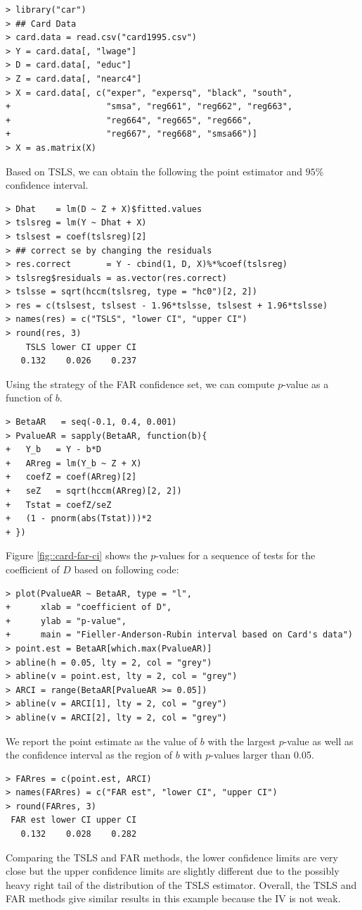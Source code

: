 \begin{lstlisting}
> library("car")
> ## Card Data
> card.data = read.csv("card1995.csv")
> Y = card.data[, "lwage"]
> D = card.data[, "educ"]
> Z = card.data[, "nearc4"]
> X = card.data[, c("exper", "expersq", "black", "south", 
+                   "smsa", "reg661", "reg662", "reg663", 
+                   "reg664", "reg665", "reg666", 
+                   "reg667", "reg668", "smsa66")]
> X = as.matrix(X)
\end{lstlisting}


Based on TSLS, we can obtain the following the point estimator and $95\%$ confidence interval. 
\begin{lstlisting}
> Dhat    = lm(D ~ Z + X)$fitted.values
> tslsreg = lm(Y ~ Dhat + X)
> tslsest = coef(tslsreg)[2]
> ## correct se by changing the residuals
> res.correct       = Y - cbind(1, D, X)%*%coef(tslsreg)
> tslsreg$residuals = as.vector(res.correct)
> tslsse = sqrt(hccm(tslsreg, type = "hc0")[2, 2])
> res = c(tslsest, tslsest - 1.96*tslsse, tslsest + 1.96*tslsse)
> names(res) = c("TSLS", "lower CI", "upper CI")
> round(res, 3)
    TSLS lower CI upper CI 
   0.132    0.026    0.237 
\end{lstlisting}


Using the strategy of the FAR confidence set, we can compute $p$-value as a function of $b$. 
\begin{lstlisting}
> BetaAR   = seq(-0.1, 0.4, 0.001)
> PvalueAR = sapply(BetaAR, function(b){
+   Y_b   = Y - b*D
+   ARreg = lm(Y_b ~ Z + X)
+   coefZ = coef(ARreg)[2]
+   seZ   = sqrt(hccm(ARreg)[2, 2])
+   Tstat = coefZ/seZ
+   (1 - pnorm(abs(Tstat)))*2
+ })
\end{lstlisting}
Figure \ref{fig::card-far-ci} shows the $p$-values for a sequence of tests for the coefficient of $D$ based on following  code:
\begin{lstlisting}
> plot(PvalueAR ~ BetaAR, type = "l",
+      xlab = "coefficient of D",
+      ylab = "p-value",
+      main = "Fieller-Anderson-Rubin interval based on Card's data")
> point.est = BetaAR[which.max(PvalueAR)]
> abline(h = 0.05, lty = 2, col = "grey")
> abline(v = point.est, lty = 2, col = "grey")
> ARCI = range(BetaAR[PvalueAR >= 0.05])
> abline(v = ARCI[1], lty = 2, col = "grey")
> abline(v = ARCI[2], lty = 2, col = "grey")
\end{lstlisting}
We report the point estimate as the value of $b$ with the largest $p$-value as well as the confidence interval as the region of $b$ with $p$-values larger than 0.05. 
\begin{lstlisting}
> FARres = c(point.est, ARCI)
> names(FARres) = c("FAR est", "lower CI", "upper CI")
> round(FARres, 3)
 FAR est lower CI upper CI 
   0.132    0.028    0.282
\end{lstlisting}
Comparing the TSLS and FAR methods, the lower confidence limits are very close but the upper confidence limits are slightly different due to the possibly heavy right tail of the distribution of the TSLS estimator. Overall, the TSLS and FAR methods give similar results in this example because the IV is not weak. 
 


